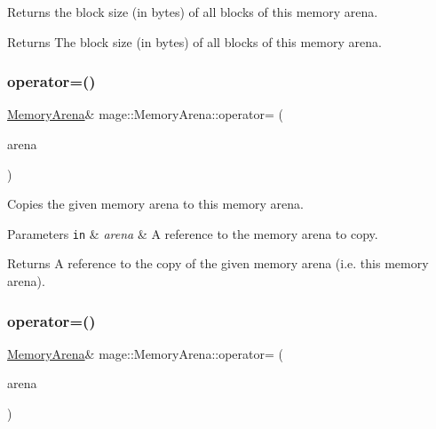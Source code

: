 Returns the block size (in bytes) of all blocks of this memory arena.

\begin{DoxyReturn}{Returns}
The block size (in bytes) of all blocks of this memory arena. 
\end{DoxyReturn}
\hypertarget{classmage_1_1_memory_arena_a7e7799f859c55435714933972ecb8b95}{}\label{classmage_1_1_memory_arena_a7e7799f859c55435714933972ecb8b95} 
\subsubsection{\texorpdfstring{operator=()}{operator=()}\hspace{0.1cm}{\footnotesize\ttfamily [1/2]}}
{\footnotesize\ttfamily \hyperlink{classmage_1_1_memory_arena}{Memory\+Arena}\& mage\+::\+Memory\+Arena\+::operator= (\begin{DoxyParamCaption}\item[{const \hyperlink{classmage_1_1_memory_arena}{Memory\+Arena} \&}]{arena }\end{DoxyParamCaption})\hspace{0.3cm}{\ttfamily [delete]}}

Copies the given memory arena to this memory arena.


\begin{DoxyParams}[1]{Parameters}
\mbox{\tt in}  & {\em arena} & A reference to the memory arena to copy. \\
\hline
\end{DoxyParams}
\begin{DoxyReturn}{Returns}
A reference to the copy of the given memory arena (i.\+e. this memory arena). 
\end{DoxyReturn}
\hypertarget{classmage_1_1_memory_arena_aa4b80a917a838a1ca3788f906723d273}{}\label{classmage_1_1_memory_arena_aa4b80a917a838a1ca3788f906723d273} 
\subsubsection{\texorpdfstring{operator=()}{operator=()}\hspace{0.1cm}{\footnotesize\ttfamily [2/2]}}
{\footnotesize\ttfamily \hyperlink{classmage_1_1_memory_arena}{Memory\+Arena}\& mage\+::\+Memory\+Arena\+::operator= (\begin{DoxyParamCaption}\item[{\hyperlink{classmage_1_1_memory_arena}{Memory\+Arena} \&\&}]{arena }\end{DoxyParamCaption})\hspace{0.3cm}{\ttfamily [delete]}}

